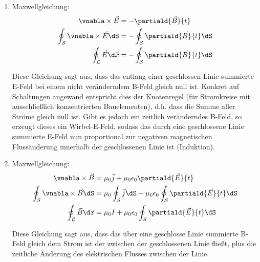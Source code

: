 \documentclass[11pt]{article}
\begin{document}
\begin{enumerate}
    
    \item Maxwellgleichung:\\
    \begin{align*}
        \vnabla \times \vec E &= -\partiald{\vec B}{t}\\
        \oint_{\mathcal S} \vnabla \times \vec E \dS &= -\oint_{\mathcal S}\partiald{\vec B}{t}\dS\\
        \oint_{\mathcal L} \vec E \d \vec x &=- \oint_{\mathcal S} \partiald{\vec B}{t}\dS
    \end{align*}
    \begin{adjustwidth}{20pt}{}
        Diese Gleichung sagt aus, dass das entlang einer geschlossen Linie summierte E-Feld 
        bei einem nicht veränderndem B-Feld gleich null ist. Konkret auf 
        Schaltungen angewand entspricht dies der Knotenregel 
        (für Stromkreise mit ausschließlich
        konzentrierten Bauelementen), d.h.
        dass die Summe aller Ströme gleich null ist.
        Gibt es jedoch ein zeitlich veränderndes B-Feld, so erzeugt dieses
        ein Wirbel-E-Feld, sodass das durch eine geschlossene Linie summierte
        E-Feld nun proportional zur negativen magnetischen Flussänderung innerhalb der geschlossenen 
        Linie ist (Induktion).
    \end{adjustwidth}
    
    \item Maxwellgleichung:\\
    \begin{align*}
        \vnabla \times \vec B &= \mu_0\vec j + \mu_0\epsilon_0\partiald{\vec E}{t}\\
        \oint_{\mathcal S} \vnabla \times \vec B \dS &=  \mu_0\oint_{\mathcal S}\vec j \dS + \mu_0\epsilon_0\oint_{\mathcal S} \partiald{\vec E}{t}\dS\\
        \oint_{\mathcal L} \vec B \d \vec x &= \mu_0 I+ \mu_0 \epsilon_0\oint_{\mathcal S} \partiald{\vec E}{t}\dS
    \end{align*}
    \begin{adjustwidth}{20pt}{}
        Diese Gleichung sagt aus, dass das über eine geschlosse Linie summierte 
        B-Feld gleich dem Strom ist der zwischen der geschlossenen Linie fließt, 
        plus die zeitliche Änderung des elektrischen Flusses zwischen der Linie. 
    \end{adjustwidth}
\end{enumerate}
\end{document}
